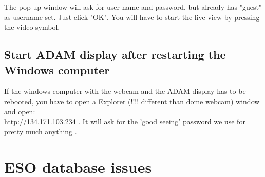 \documentclass[11pt,fleqn,a4paper]{book}
\begin{document}
The pop-up window will ask for user name and password, but already has "guest" as username set. Just click "OK". You will have to start the live view by pressing the video symbol.

\subsection{Start ADAM display after restarting the Windows computer}
If the windows computer with the webcam and the ADAM display has to be rebooted, you have to open a Explorer (!!!! different than dome webcam) window and open:\\
\url{http://134.171.103.234} . It will ask for the 'good seeing' password we use for pretty much anything .


\section{ESO database issues}
\end{document}
